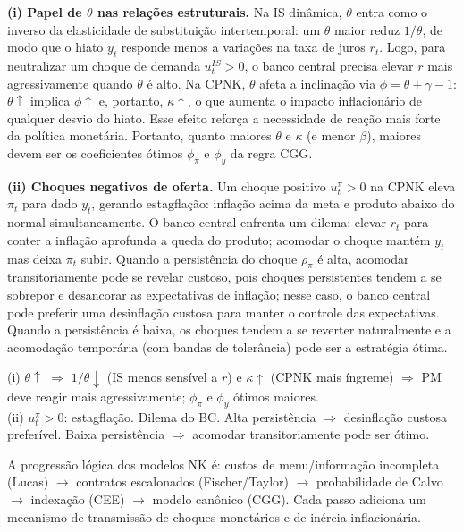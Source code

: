 \documentclass[12pt, a4paper]{article}
\begin{document}
\textbf{(i) Papel de $\theta$ nas relações estruturais.} Na IS dinâmica, $\theta$ entra como o inverso da elasticidade de substituição intertemporal: um $\theta$ maior reduz $1/\theta$, de modo que o hiato $y_t$ responde menos a variações na taxa de juros $r_t$. Logo, para neutralizar um choque de demanda $u_t^{IS} > 0$, o banco central precisa elevar $r$ mais agressivamente quando $\theta$ é alto. Na CPNK, $\theta$ afeta a inclinação via $\phi = \theta + \gamma - 1$: $\theta\uparrow$ implica $\phi\uparrow$ e, portanto, $\kappa\uparrow$, o que aumenta o impacto inflacionário de qualquer desvio do hiato. Esse efeito reforça a necessidade de reação mais forte da política monetária. Portanto, quanto maiores $\theta$ e $\kappa$ (e menor $\beta$), maiores devem ser os coeficientes ótimos $\phi_\pi$ e $\phi_y$ da regra CGG.

\textbf{(ii) Choques negativos de oferta.} Um choque positivo $u_t^\pi > 0$ na CPNK eleva $\pi_t$ para dado $y_t$, gerando estagflação: inflação acima da meta e produto abaixo do normal simultaneamente. O banco central enfrenta um dilema: elevar $r_t$ para conter a inflação aprofunda a queda do produto; acomodar o choque mantém $y_t$ mas deixa $\pi_t$ subir. Quando a persistência do choque $\rho_\pi$ é alta, acomodar transitoriamente pode se revelar custoso, pois choques persistentes tendem a se sobrepor e desancorar as expectativas de inflação; nesse caso, o banco central pode preferir uma desinflação custosa para manter o controle das expectativas. Quando a persistência é baixa, os choques tendem a se reverter naturalmente e a acomodação temporária (com bandas de tolerância) pode ser a estratégia ótima.

\begin{resultbox}[title={Papel de $\theta$ e Choques de Oferta no CGG (Lista II Q11)}]
(i) $\theta\uparrow$ $\Rightarrow$ $1/\theta\downarrow$ (IS menos sensível a $r$) e $\kappa\uparrow$ (CPNK mais íngreme) $\Rightarrow$ PM deve reagir mais agressivamente; $\phi_\pi$ e $\phi_y$ ótimos maiores.\\
(ii) $u_t^\pi > 0$: estagflação. Dilema do BC. Alta persistência $\Rightarrow$ desinflação custosa preferível. Baixa persistência $\Rightarrow$ acomodar transitoriamente pode ser ótimo.
\end{resultbox}

\begin{provabox}[title={Rigidez Nominal e Efeitos Reais da Moeda --- Para a Prova}]
A progressão lógica dos modelos NK é: custos de menu/informação incompleta (Lucas) $\to$ contratos escalonados (Fischer/Taylor) $\to$ probabilidade de Calvo $\to$ indexação (CEE) $\to$ modelo canônico (CGG). Cada passo adiciona um mecanismo de transmissão de choques monetários e de inércia inflacionária.
\end{provabox}
\end{document}
